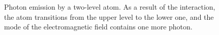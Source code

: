 \begin{figure}
\centering



\caption{Photon emission by a two-level atom. As a result of the
  interaction, the atom transitions from the upper level to the lower one, and the mode
  of the electromagnetic field contains one more photon.}
\label{figPart1Ch2_4}
\end{figure}